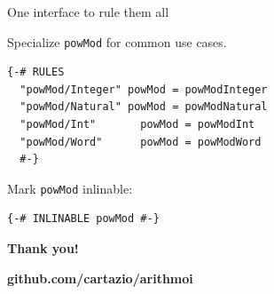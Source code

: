 \documentclass[handout]{beamer}
\begin{document}
\begin{frame}[fragile]{One interface to rule them all}

Specialize {\tt powMod} for common use cases.

\begin{lstlisting}
{-# RULES
  "powMod/Integer" powMod = powModInteger
  "powMod/Natural" powMod = powModNatural
  "powMod/Int"       powMod = powModInt
  "powMod/Word"      powMod = powModWord
  #-}
\end{lstlisting}

Mark {\tt powMod} inlinable:

\begin{lstlisting}
{-# INLINABLE powMod #-}
\end{lstlisting}

\end{frame}

\begin{frame}
\centerline{\Huge\bf Thank you!}
\bigskip
\centerline{\huge\bf github.com/cartazio/arithmoi}
\end{frame}
\end{document}
